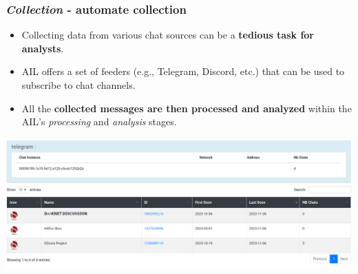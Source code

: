 \documentclass{beamer}
\begin{document}
\begin{frame}
    \frametitle{{\it Collection} - automate collection}
	\begin{itemize}
		\item Collecting data from various chat sources can be a {\bf tedious task for analysts}.
		\item AIL offers a set of feeders (e.g., Telegram, Discord, etc.) that can be used to subscribe to chat channels.
        \item All the {\bf collected messages are then processed and analyzed} within the AIL's \textit{processing} and \textit{analysis} stages.
	\end{itemize}
\begin{center}
    \includegraphics[scale=0.20]{images/ail-telegram.png}
\end{center}
\end{frame}
\end{document}
